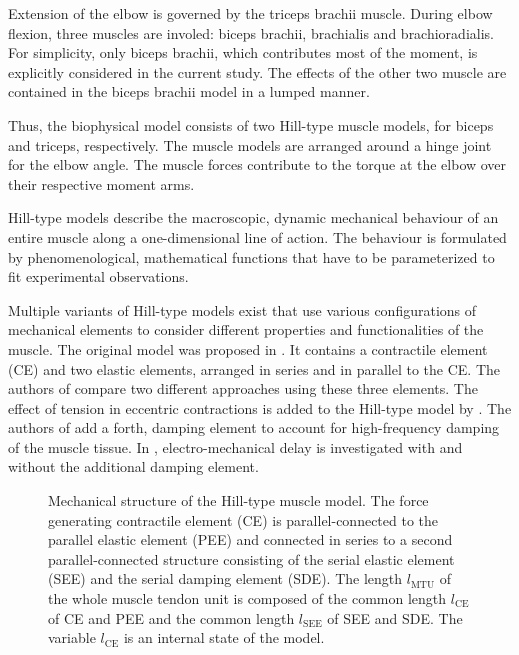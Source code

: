 Extension of the elbow is governed by the triceps brachii muscle.
During elbow flexion, three muscles are involed: biceps brachii, brachialis and brachioradialis. For simplicity, only biceps brachii, which contributes most of the moment, is explicitly considered in the current study. The effects of the other two muscle are contained in the biceps brachii model in a lumped manner.

Thus, the biophysical model consists of two Hill-type muscle models, for biceps and triceps, respectively. The muscle models are arranged around a hinge joint for the elbow angle. The muscle forces contribute to the torque at the elbow over their respective moment arms.

Hill-type models describe the macroscopic, dynamic mechanical behaviour of an entire muscle along a one-dimensional line of action.
The behaviour is formulated by phenomenological, mathematical functions that have to be parameterized to fit experimental observations.

Multiple variants of Hill-type models exist that use various configurations of mechanical elements to consider different properties and functionalities of the muscle. The original model was proposed in \cite{Hill1938}. It contains a contractile element (CE) and two elastic elements, arranged in series and in parallel to the CE.
The authors of \cite{Siebert2008} compare two different approaches using these three elements. The effect of tension in eccentric contractions is added to the Hill-type model by \cite{Till2008}. The authors of \cite{Gunther2007} add a forth, damping element to account for high-frequency damping of the muscle tissue. In \cite{Morl2012}, electro-mechanical delay is investigated with and without the additional damping element. 

\begin{figure}%
  \centering%
  \def\svgwidth{0.5\textwidth}
  \caption{Mechanical structure of the Hill-type muscle model. The force generating contractile element (CE) is parallel-connected to the parallel elastic element (PEE) and connected in series to a second parallel-connected structure consisting of the serial elastic element (SEE) and the serial damping element (SDE). The length $l_\text{MTU}$ of the whole muscle tendon unit is composed of the common length $l_\text{CE}$ of CE and PEE and the common length $l_\text{SEE}$ of SEE and SDE. The variable $l_\text{CE}$ is an internal state of the model.}
  \label{fig:hilltype}%
\end{figure}%


